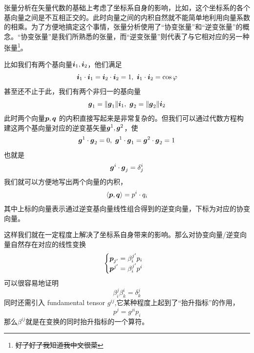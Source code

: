 \documentclass[12pt,a4paper,openany,twoside]{book}
\numberwithin{equation}{section}
\newcommand{\mean}[1]{\left\langle #1 \right\rangle}
\begin{document}
    {}

    张量分析在矢量代数的基础上考虑了坐标系自身的影响，比如，这个坐标系的各个基向量之间是不互相正交的。此时向量之间的内积自然就不能简单地利用向量系数的相乘。为了方便地搞定这个事情，张量分析使用了“协变张量”和“逆变张量”的概念。“协变张量”是我们所熟悉的张量，而“逆变张量”则代表了与它相对应的另一种张量\footnote{\sout{好了好了我知道我中文很菜}}。

    比如我们有两个基向量$\vb*{i}_1,\vb*{i}_2$，他们满足
    \begin{equation*}
      \vb*{i}_1\cdot\vb*{i}_1=\vb*{i}_2\cdot\vb*{i}_2=1,\ \vb*{i}_1\cdot\vb*{i}_2=\cos{\varphi}
    \end{equation*} 
    甚至还不止于此，我们有两个非归一的基向量
    \begin{equation*}
      \vb*{g}_1=\norm{\vb*{g}_1}\vb*{i}_1,\ \vb*{g}_2=\norm{\vb*{g}_2}\vb*{i}_2
    \end{equation*} 
    此时两个向量$\vb*{p},\vb*{q}$ 的内积直接写起来是非常复杂的。但我们可以通过代数方程构建这两个基向量对应的逆变基矢量$\vb*{g}^1,\vb*{g}^2$，使
    \begin{equation*}
      \vb*{g}^1\cdot\vb*{g}_2=0,\ \vb*{g}^1\cdot\vb*{g}_1=\vb*{g}^2\cdot\vb*{g}_2=1 
    \end{equation*} 
    也就是
    \begin{equation*}
      \vb*{g}^i\cdot\vb*{g}_j=\delta^i_j
    \end{equation*}
    我们就可以方便地写出两个向量的内积，
    \begin{equation*}
      \mean{\vb*{p},\vb*{q}}=p^i \cdot q_i
    \end{equation*} 
    其中上标的向量表示通过逆变基向量线性组合得到的逆变向量，下标为对应的协变向量。

    这样我们就在一定程度上解决了坐标系自身带来的影响。那么对协变向量/逆变向量自然存在对应的线性变换
    \begin{equation*}
      \begin{cases}
        \vb*{p}_{j'}=\beta^{j'}_i p_i \\
        \vb*{p}^{j'}=\beta^{j'}_i p^i
      \end{cases}
    \end{equation*} 
    可以很容易地证明
    \begin{equation*}
      \beta^j_i\beta^i_k=\delta^j_k
    \end{equation*}
    同时还需引入 fundamental tensor $g^{ij}$,它某种程度上起到了“抬升指标”的作用，
    \begin{equation*}
      p^j=g^{ji}p_i
    \end{equation*} 
    那么$\beta^{ij}$就是在变换的同时抬升指标的一个算符。
\end{document}
